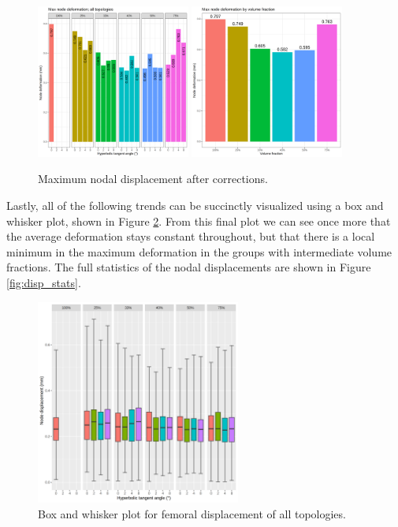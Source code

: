 \documentclass[../main.tex]{subfiles}
\begin{document}
\begin{figure}[h!]
  \includegraphics[width=0.45\textwidth]{images/results/plots/femoral/displacement/femoral_max.png}
  \hfill
  \includegraphics[width=0.45\textwidth]{images/results/plots/femoral/displacement/femoral_max_group.png}
  \caption{Maximum nodal displacement after corrections.}
  \label{fig:disp_max_correct}
\end{figure}

Lastly, all of the following trends can be succinctly visualized using a box and whisker plot, shown in Figure \ref{fig:disp_boxwhisker}. From this final plot we can see once more that the average deformation stays constant throughout, but that there is a local minimum in the maximum deformation in the groups with intermediate volume fractions. The full statistics of the nodal displacements are shown in Figure \ref{fig:disp_stats}.
 
\begin{figure}[h!]
  \centering
  \includegraphics[width=0.6\textwidth]{images/results/plots/femoral/displacement/boxplots.png}
  \caption{Box and whisker plot for femoral displacement of all topologies.}
  \label{fig:disp_boxwhisker}
\end{figure}
\end{document}
